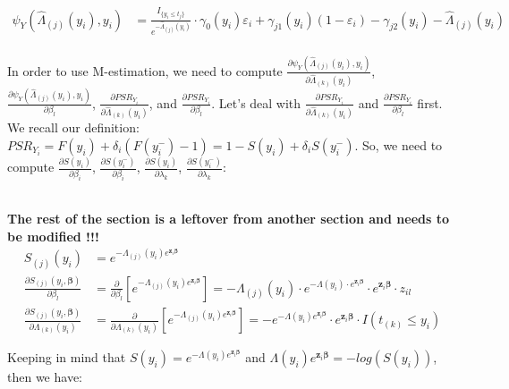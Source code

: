\documentclass[]{article}
\let\epsilon\varepsilon
\begin{document}
$$
  \begin{aligned}
    \psi_{Y}(\hat{\Lambda}_{(j)}(y_i), y_i) &= \frac{I_{\{ y_i \leq t_j \}}}{e^{-\hat{\Lambda}_{(j)}(y_i)}} \cdot \gamma_0(y_i) \epsilon_i + \gamma_{j1}(y_i)(1 - \epsilon_i) - \gamma_{j2}(y_i) - \hat{\Lambda}_{(j)}(y_i)\\
  \end{aligned}
$$


In order to use M-estimation, we need to compute $\frac{\partial \psi_{Y}(\hat{\Lambda}_{(j)}(y_i), y_i)}{ \partial \hat{\Lambda}_{(k)}(y_i)}$, $\frac{\partial \psi_{Y}(\hat{\Lambda}_{(j)}(y_i), y_i)}{ \partial \beta_l}$, $\frac{\partial PSR_{Y_i}}{ \partial \hat{\Lambda}_{(k)}(y_i)}$, and $\frac{\partial PSR_{Y_i}}{ \partial \beta_l}$. Let's deal with $\frac{\partial PSR_{Y_i}}{ \partial \hat{\Lambda}_{(k)}(y_i)}$ and $\frac{\partial PSR_{Y_i}}{ \partial \beta_l}$ first.
We recall our definition: $PSR_{Y_i} =  F(y_i) + \delta_i (F(y_{i}^-) - 1) = 1 - S(y_i) + \delta_i S(y_i^-)$. So, we need to compute $\frac{\partial S(y_i)}{\partial \beta_i}$, $\frac{\partial S(y_i^-)}{\partial \beta_i}$, $\frac{\partial S(y_i)}{\partial \lambda_k}$, $\frac{\partial S(y_i^-)}{\partial \lambda_k}$:


~\\ \textbf{The rest of the section is a leftover from another section and needs to be modified !!!}\\
$$
  \begin{aligned}
    S_{(j)}(y_i) &=  e^{-\Lambda_{(j)}(y_i) e^{\pmb{z}_i\pmb{\beta}}} \\
    \frac{\partial S_{(j)}(y_i, \pmb{\beta})}{\partial \beta_l} &= \frac{\partial}{\partial \beta_l}\left[  e^{-\Lambda_{(j)}(y_i) e^{\pmb{z}_i\pmb{\beta}}}  \right] =   -\Lambda_{(j)}(y_i)  \cdot   e^{-\Lambda(y_i) \cdot e^{\pmb{z}_i\pmb{\beta}}}  \cdot  e^{\pmb{z}_i\pmb{\beta}}   \cdot z_{il} \\
    \frac{\partial S_{(j)}(y_i, \pmb{\beta})}{\partial \Lambda_{(k)}(y_i)} &= \frac{\partial}{\partial \Lambda_{(k)}(y_i)}\left[  e^{-\Lambda_{(j)}(y_i) e^{\pmb{z}_i\pmb{\beta}}}  \right] =   -e^{-\Lambda(y_i) e^{\pmb{z}_i\pmb{\beta}}}  \cdot  e^{\pmb{z}_i\pmb{\beta}}  \cdot I(t_{(k)}\leq y_i)
  \end{aligned}
  $$

Keeping in mind that $S(y_i) =  e^{-\Lambda(y_i) e^{\pmb{z}_i\pmb{\beta}}}$ and $\Lambda(y_i) e^{\pmb{z}_i\pmb{\beta}} = -log\left(S(y_i)\right)$, then we have:
\end{document}

